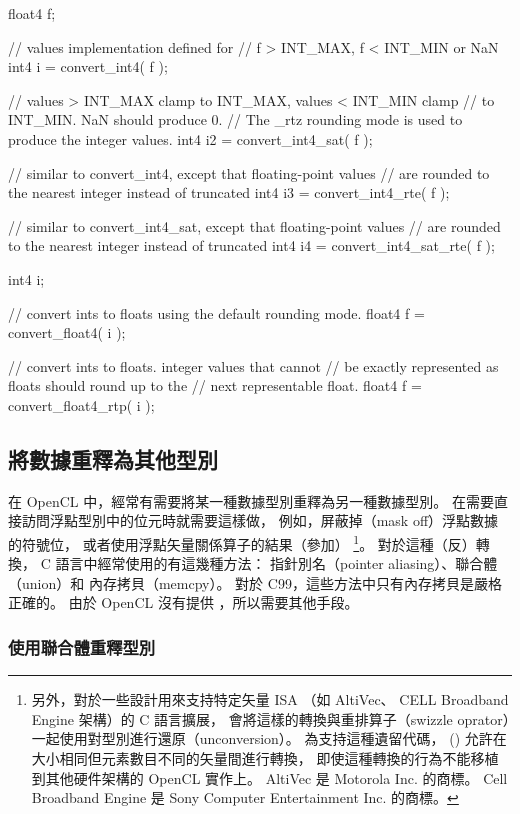 \startexample
\startclc
float4 f;

// values implementation defined for
// f > INT_MAX, f < INT_MIN or NaN
int4	i = convert_int4( f );

// values > INT_MAX clamp to INT_MAX, values < INT_MIN clamp
// to INT_MIN. NaN should produce 0.
// The _rtz rounding mode is used to produce the integer values.
int4	i2 = convert_int4_sat( f );

// similar to convert_int4, except that floating-point values
// are rounded to the nearest integer instead of truncated
int4	i3 = convert_int4_rte( f );

// similar to convert_int4_sat, except that floating-point values
// are rounded to the nearest integer instead of truncated
int4	i4 = convert_int4_sat_rte( f );
\stopclc
\stopexample

\startexample
\startclc
int4	i;

// convert ints to floats using the default rounding mode.
float4 f = convert_float4( i );

// convert ints to floats. integer values that cannot
// be exactly represented as floats should round up to the
// next representable float.
float4 f = convert_float4_rtp( i );
\stopclc
\stopexample

\subsection[sec:reinterpret]{將數據重釋為其他型別}

在 OpenCL 中，經常有需要將某一種數據型別重釋為另一種數據型別。
在需要直接訪問浮點型別中的位元時就需要這樣做，
例如，屏蔽掉（mask off）浮點數據的符號位，
或者使用浮點矢量關係算子的結果（參加）
\footnote{另外，對於一些設計用來支持特定矢量 ISA
（如 AltiVec、 CELL Broadband Engine 架構）的 C 語言擴展，
會將這樣的轉換與重排算子（swizzle oprator）一起使用對型別進行還原（unconversion）。
為支持這種遺留代碼， () 允許在大小相同但元素數目不同的矢量間進行轉換，
即使這種轉換的行為不能移植到其他硬件架構的 OpenCL 實作上。
 AltiVec 是 Motorola Inc. 的商標。
 Cell Broadband Engine 是 Sony Computer Entertainment Inc. 的商標。}。
對於這種（反）轉換， C 語言中經常使用的有這幾種方法：
指針別名（pointer aliasing）、聯合體（union）和 內存拷貝（memcpy）。
對於 C99，這些方法中只有內存拷貝是嚴格正確的。
由於 OpenCL 沒有提供 ，所以需要其他手段。

\subsubsection{使用聯合體重釋型別}

